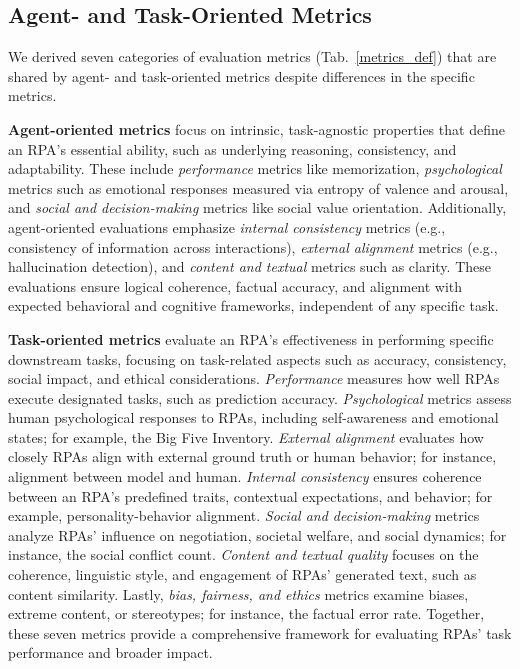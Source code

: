 \subsection{Agent- and Task-Oriented Metrics}
We derived seven categories of evaluation metrics (Tab.~\ref{metrics_def}) that are shared by agent- and task-oriented metrics despite differences in the specific metrics. 




\textbf{Agent-oriented metrics} focus on intrinsic, task-agnostic properties that define an RPA's essential ability, such as underlying reasoning, consistency, and adaptability. 
These include \textit{performance} metrics like memorization, \textit{psychological} metrics such as emotional responses measured via entropy of valence and arousal, and \textit{social and decision-making} metrics like social value orientation. 
Additionally, agent-oriented evaluations emphasize \textit{internal consistency} metrics (e.g., consistency of information across interactions), \textit{external alignment} metrics (e.g., hallucination detection), and \textit{content and textual} metrics such as clarity. 
These evaluations ensure logical coherence, factual accuracy, and alignment with expected behavioral and cognitive frameworks, independent of any specific task. 

\textbf{Task-oriented metrics} evaluate an RPA's effectiveness in performing specific downstream tasks, focusing on task-related aspects such as accuracy, consistency, social impact, and ethical considerations. 
\textit{Performance} measures how well RPAs execute designated tasks, such as prediction accuracy. 
\textit{Psychological} metrics assess human psychological responses to RPAs, including self-awareness and emotional states; for example, the Big Five Inventory. 
\textit{External alignment} evaluates how closely RPAs align with external ground truth or human behavior; for instance, alignment between model and human. 
\textit{Internal consistency} ensures coherence between an RPA’s predefined traits, contextual expectations, and behavior; for example, personality-behavior alignment. 
\textit{Social and decision-making} metrics analyze RPAs’ influence on negotiation, societal welfare, and social dynamics; for instance, the social conflict count. 
\textit{Content and textual quality} focuses on the coherence, linguistic style, and engagement of RPAs’ generated text, such as content similarity. 
Lastly, \textit{bias, fairness, and ethics} metrics examine biases, extreme content, or stereotypes; for instance, the factual error rate.
Together, these seven metrics provide a comprehensive framework for evaluating RPAs' task performance and broader impact.




